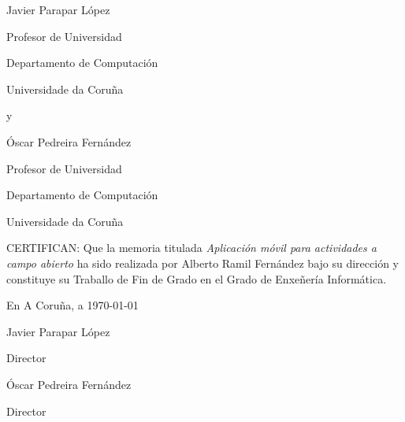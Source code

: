 \documentclass[11pt,a4paper,titlepage,twoside,openright]{report}
\begin{document}
\begin{titlepage}
\pagestyle{empty}

\begin{minipage}[t][4cm][l]{.4\textwidth}
\begin{center}
{\sc Javier Parapar López}

Profesor de Universidad

Departamento de Computación

Universidade da Coruña
\end{center}
\end{minipage}
\begin{minipage}[t][4cm][l]{.1\textwidth}
\begin{center}
\vspace{1.2\baselineskip}
y
\end{center}
\end{minipage}
\begin{minipage}[t][4cm][l]{.4\textwidth}
\begin{center}
{\sc Óscar Pedreira Fernández}

Profesor de Universidad

Departamento de Computación

Universidade da Coruña
\end{center}
\end{minipage}

\vspace{2cm}

CERTIFICAN:
Que la memoria titulada {\it Aplicación móvil para actividades a campo abierto} ha sido realizada por {\sc Alberto Ramil Fernández} bajo su dirección y constituye su Traballo de Fin de Grado en el Grado de Enxeñería Informática.\\[4pt]
\begin{center}
En A Coruña, a \today
\end{center}

\vspace{3cm}

\begin{minipage}[t][5cm][l]{.45\textwidth}
\begin{center}
{\sc Javier Parapar López}

Director
\end{center}
\end{minipage}
\begin{minipage}[t][5cm][l]{.45\textwidth}
\begin{center}
{\sc Óscar Pedreira Fernández}

Director
\end{center}
\end{minipage}
\end{titlepage}
\cleardoublepage
\end{document}
